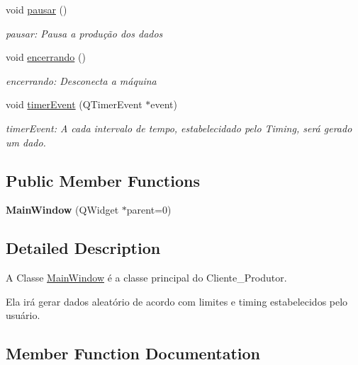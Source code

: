 \begin{DoxyCompactItemize}
\mbox{\label{class_main_window_abfb7a4c66aa95cce5d182637e1e1d5d9}} 
void \hyperlink{class_main_window_abfb7a4c66aa95cce5d182637e1e1d5d9}{pausar} ()
\begin{DoxyCompactList}\small\item\em pausar\+: Pausa a produção dos dados \end{DoxyCompactList}\item 
\mbox{\label{class_main_window_a99081ab248ec1dea26c70daeb5a2f5e3}} 
void \hyperlink{class_main_window_a99081ab248ec1dea26c70daeb5a2f5e3}{encerrando} ()
\begin{DoxyCompactList}\small\item\em encerrando\+: Desconecta a máquina \end{DoxyCompactList}\item 
void \hyperlink{class_main_window_aaa425b1554af3c1f58cc70b4815082ae}{timer\+Event} (Q\+Timer\+Event $\ast$event)
\begin{DoxyCompactList}\small\item\em timer\+Event\+: A cada intervalo de tempo, estabelecidado pelo Timing, será gerado um dado. \end{DoxyCompactList}\end{DoxyCompactItemize}
\subsection*{Public Member Functions}
\begin{DoxyCompactItemize}
\item 
\mbox{\label{class_main_window_a8b244be8b7b7db1b08de2a2acb9409db}} 
{\bfseries Main\+Window} (Q\+Widget $\ast$parent=0)
\end{DoxyCompactItemize}


\subsection{Detailed Description}
A Classe \hyperlink{class_main_window}{Main\+Window} é a classe principal do Cliente\+\_\+\+Produtor. 

Ela irá gerar dados aleatório de acordo com limites e timing estabelecidos pelo usuário. 

\subsection{Member Function Documentation}
\mbox{\label{class_main_window_aaa425b1554af3c1f58cc70b4815082ae}} 
